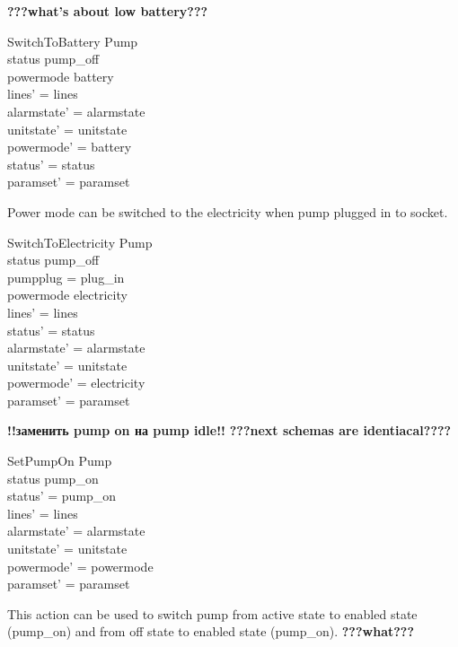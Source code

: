 \documentclass{article}
\begin{document}
\textbf{???what's about low battery???}
	\begin{schema}{SwitchToBattery}
		\Delta Pump \\
	\where 
		status \neq pump\_off \\
		powermode \neq battery\\
		lines' = lines \\
		alarmstate' = alarmstate \\
		unitstate' = unitstate \\
		powermode' = battery \\
		status' = status \\
		paramset' = paramset \\
	\end{schema}
	
		Power mode can be switched to the electricity when pump plugged in to socket.
	
	\begin{schema}{SwitchToElectricity}
		\Delta Pump \\
	\where 
		status \neq pump\_off \\
		pumpplug = plug\_in \\
		powermode \neq electricity \\
		lines' = lines \\
		status' = status \\
		alarmstate' = alarmstate \\
		unitstate' = unitstate \\
		powermode' = electricity \\
		paramset' = paramset \\
	\end{schema}
	

\textbf{!!заменить pump on на pump idle!!}
\textbf{???next schemas are identiacal????}
	\begin{schema}{SetPumpOn}
		\Delta Pump \\
	\where 
		status \neq pump\_on \\
		status' = pump\_on \\
		lines' = lines \\
    	alarmstate' = alarmstate \\
    	unitstate' = unitstate \\
    	powermode' = powermode \\
		paramset' = paramset
	\end{schema}
	
	This action can be used to switch pump from active state to enabled state (pump\_on) and from off state to enabled state (pump\_on).
	\textbf{???what???}
	
\end{document}
